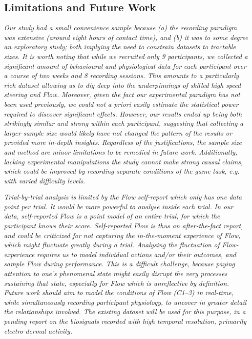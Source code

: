 \documentclass[10pt,letterpaper,floatsintext]{article}
\begin{document}
\subsection{Limitations and Future Work}
{\it Our study had a small convenience sample because (a) the recording paradigm was extensive (around eight hours of contact time), and (b) it was to some degree an exploratory study; both implying the need to constrain datasets to tractable sizes. It is worth noting that while we recruited only 9 participants, we collected a significant amount of behavioural and physiological data for each participant over a course of two weeks and 8 recording sessions. This amounts to a particularly rich dataset allowing us to dig deep into the underpinnings of skilled high speed steering and Flow. Moreover, given the fact our experimental paradigm has not been used previously, we could not {\it a priori} easily estimate the statistical power required to discover significant effects. However, our results ended up being both strikingly {\it similar} and {\it strong} within each participant, suggesting that collecting a larger sample size would likely have {\it not} changed the pattern of the results or provided more in-depth insights. Regardless of the justifications, the sample size and method are minor limitations to be remedied in future work. Additionally, lacking experimental manipulations the study cannot make strong causal claims, which could be improved by recording separate conditions of the game task, e.g. with varied difficulty levels.}

{\it Trial-by-trial analysis is limited by the Flow self-report which only has one data point per trial. It would be more powerful to analyse {\it inside} each trial. In our data, self-reported Flow is a point model of an entire trial, for which the participant knows their score. Self-reported Flow is thus an after-the-fact report, and could be criticized for not capturing the in-the-moment {\it experience of Flow}, which might fluctuate greatly during a trial. Analysing the fluctuation of Flow-experience requires us to model individual actions and/or their outcomes, and sample Flow during performance. This is a difficult challenge, because paying attention to one's phenomenal state might easily disrupt the very processes sustaining that state, especially for Flow which is unreflective by definition. Future work should aim to model the conditions of Flow ({\sf C1--3}) in real-time, while simultaneously recording participant physiology, to uncover in greater detail the relationships involved. The existing dataset will be used for this purpose, in a pending report on the biosignals recorded with high temporal resolution, primarily electro-dermal activity.}
\end{document}
